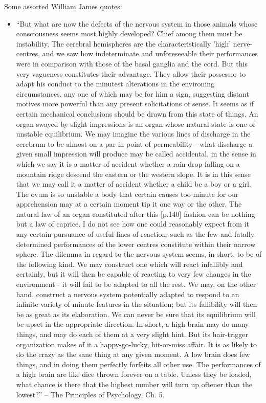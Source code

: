 \documentclass[11pt]{article}
\begin{document}
Some assorted William James quotes:
\begin{itemize}
\item ``But what are now the defects of the nervous system in those animals whose consciousness seems most highly developed? Chief among them must be instability. The cerebral hemispheres are the characteristically 'high' nerve-centres, and we saw how indeterminate and unforeseeable their performances were in comparison with those of the basal ganglia and the cord. But this very vagueness constitutes their advantage. They allow their possessor to adapt his conduct to the minutest alterations in the environing circumstances, any one of which may be for him a sign, suggesting distant motives more powerful than any present solicitations of sense. It seems as if certain mechanical conclusions should be drawn from this state of things. An organ swayed by slight impressions is an organ whose natural state is one of unstable equilibrium. We may imagine the various lines of discharge in the cerebrum to be almost on a par in point of permeability - what discharge a given small impression will produce may be called accidental, in the sense in which we say it is a matter of accident whether a rain-drop falling on a mountain ridge descend the eastern or the western slope. It is in this sense that we may call it a matter of accident whether a child be a boy or a girl. The ovum is so unstable a body that certain causes too minute for our apprehension may at a certain moment tip it one way or the other. The natural law of an organ constituted after this [p.140] fashion can be nothing but a law of caprice. I do not see how one could reasonably expect from it any certain pursuance of useful lines of reaction, such as the few and fatally determined performances of the lower centres constitute within their narrow sphere. The dilemma in regard to the nervous system seems, in short, to be of the following kind. We may construct one which will react infallibly and certainly, but it will then be capable of reacting to very few changes in the environment - it will fail to be adapted to all the rest. We may, on the other hand, construct a nervous system potentially adapted to respond to an infinite variety of minute features in the situation; but its fallibility will then be as great as its elaboration. We can never be sure that its equilibrium will be upset in the appropriate direction. In short, a high brain may do many things, and may do each of them at a very slight hint. But its hair-trigger organization makes of it a happy-go-lucky, hit-or-miss affair. It is as likely to do the crazy as the sane thing at any given moment. A low brain does few things, and in doing them perfectly forfeits all other use. The performances of a high brain are like dice thrown forever on a table. Unless they be loaded, what chance is there that the highest number will turn up oftener than the lowest?'' -- The Principles of Psychology, Ch. 5.
\end{itemize}




\end{document}
